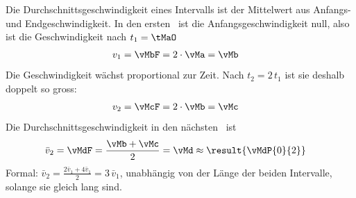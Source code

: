 Die Durchschnittsgeschwindigkeit eines Intervalls ist der Mittelwert aus Anfangs- und Endgeschwindigkeit. In den ersten \tMaO\ ist die Anfangsgeschwindigkeit null, also ist die Geschwindigkeit nach $t_1 = \tMaO$
\begin{align}
 v_1 &= \vMbF = 2\cdot\vMa = \vMb
\end{align}
Die Geschwindigkeit wächst proportional zur Zeit. Nach $t_2 = 2\,t_1$ ist sie deshalb doppelt so gross:
\begin{align}
 v_2 &= \vMcF = 2\cdot\vMb = \vMc
\end{align}
Die Durchschnittsgeschwindigkeit in den nächsten \tMaO\ ist
\begin{align}
 \bar v_2 &= \vMdF = \frac{\vMb+\vMc}{2} = \vMd \approx \result{\vMdP{0}{2}}
\end{align}
Formal: $\bar v_2 = \frac{2\bar v_1+4\bar v_1}{2} = 3\,\bar v_1$, unabhängig von der Länge der beiden Intervalle, solange sie gleich lang sind.
